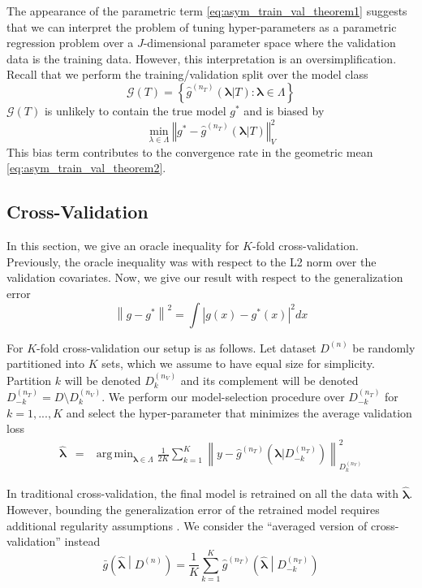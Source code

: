 \documentclass[12pt]{article}
\DeclareMathOperator*{\argmin}{arg\,min}
\begin{document}
The appearance of the parametric term \eqref{eq:asym_train_val_theorem1} suggests that we can interpret the problem of tuning hyper-parameters as a parametric regression problem over a $J$-dimensional parameter space where the validation data is the training data. However, this interpretation is an oversimplification. Recall that we perform the training/validation split over the model class
\begin{equation}
\mathcal{G}(T) = \left \{ \hat{g}^{(n_T)}( {\boldsymbol{\lambda}}| T) : \boldsymbol{\lambda} \in \Lambda \right \}
\end{equation}
$\mathcal{G}(T)$ is unlikely to contain the true model $g^*$ and is biased by
\begin{equation}
\min_{\lambda \in \Lambda} \left\Vert g^* - \hat{g}^{(n_T)}( \boldsymbol{\lambda}|T) \right \Vert^2_{V}
\end{equation}
This bias term contributes to the convergence rate in the geometric mean \eqref{eq:asym_train_val_theorem2}.

\subsection{Cross-Validation}\label{sec:cv}

In this section, we give an oracle inequality for $K$-fold cross-validation. Previously, the oracle inequality was with respect to the L2 norm over the validation covariates. Now, we give our result with respect to the generalization error
\begin{equation}
\left \| g - g^* \right \|^2 = \int \left |g(x) - g^*(x) \right |^2 dx
\end{equation}

For $K$-fold cross-validation our setup is as follows. Let dataset $D^{(n)}$ be randomly partitioned into $K$ sets, which we assume to have equal size for simplicity. Partition $k$ will be denoted $D_k^{(n_V)}$ and its complement will be denoted $D_{-k}^{(n_T)} = D \setminus D_k^{(n_V)}$. We perform our model-selection procedure over $D_{-k}^{(n_T)}$ for $k=1,...,K$ and select the hyper-parameter that minimizes the average validation loss
\begin{eqnarray}
\label{kfold_opt}
\hat{\boldsymbol \lambda} &=& \argmin_{\boldsymbol{\lambda} \in\Lambda} \frac{1}{2K} \sum_{k=1}^K  \left \| y-\hat{g}^{(n_T)}(\boldsymbol \lambda | D_{-k}^{(n_T)}) \right \|_{D_k^{(n_V)}}^{2}
\end{eqnarray}

In traditional cross-validation, the final model is retrained on all the data with $\hat{\boldsymbol{\lambda}}$. However, bounding the generalization error of the retrained model requires additional regularity assumptions \citep{lecue2012oracle}. We consider the ``averaged version of cross-validation'' instead
\begin{equation}
\label{thrm:avg_cv}
\bar{g}\left ( \hat{\boldsymbol \lambda} \middle | {D^{(n)}} \right ) = 
\frac{1}{K} \sum_{k=1}^K 
\hat{g}^{(n_T)} \left (\hat{\boldsymbol \lambda} \middle | D^{(n_T)}_{-k} \right )
\end{equation}
\end{document}
